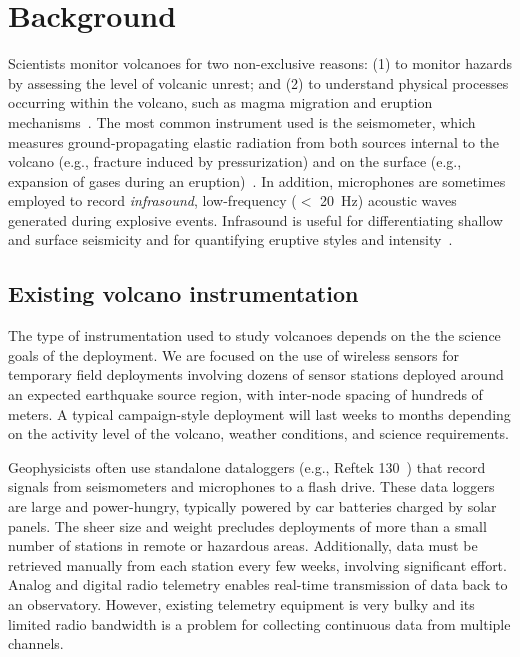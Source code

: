 \section{Background}
\label{sec-background}

Scientists monitor volcanoes for two non-exclusive reasons: (1) to
monitor hazards by assessing the level of volcanic unrest; 
and (2) to understand physical processes occurring within the
volcano, such as magma migration and eruption
mechanisms~\cite{scarpa-96,mcnutt-96}. 
The most common instrument used is the seismometer, which
measures ground-propagating elastic radiation from both sources internal 
to the volcano (e.g., fracture induced by pressurization) and on the 
surface (e.g., expansion of gases during an eruption)~\cite{mcnutt-96}.  
In addition, microphones are sometimes employed to record {\em
infrasound}, low-frequency ($<$ 20~Hz) acoustic waves generated during
explosive events. Infrasound is useful for differentiating
shallow and surface seismicity and for quantifying eruptive styles and
intensity~\cite{johnson-etal-04b}.

\subsection{Existing volcano instrumentation}

The type of instrumentation used to study volcanoes depends on the 
the science goals of the deployment. We are focused on the use of
wireless sensors for temporary field deployments involving
dozens of sensor stations deployed around an
expected earthquake source region, with inter-node spacing of
hundreds of meters. A typical campaign-style deployment will last 
weeks to months depending on the activity level of the volcano, 
weather conditions, and science requirements.

Geophysicists often use standalone dataloggers 
(e.g., Reftek 130~\cite{reftek}) that record signals
from seismometers and microphones to a flash drive.
These data loggers are large and power-hungry,
typically powered by car batteries charged by solar panels. 
The sheer size and weight precludes deployments of 
more than a small number of stations
in remote or hazardous areas. Additionally, data must be 
retrieved manually from each station every few weeks,
involving significant effort. Analog and digital radio telemetry 
enables real-time transmission of data back to an observatory. 
However, existing telemetry equipment is very bulky and its limited 
radio bandwidth is a problem for collecting continuous data 
from multiple channels.

